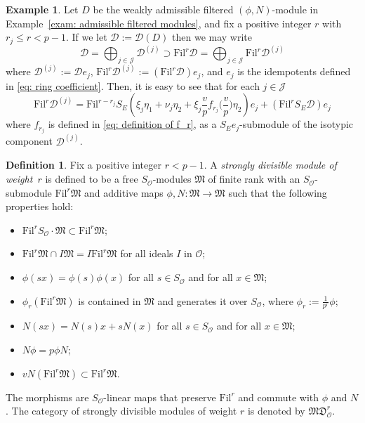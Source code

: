 \documentclass[11pt]{amsart}
\theoremstyle{definition}
\numberwithin{equation}{subsection}
\theoremstyle{plain}
\theoremstyle{plain}
\theoremstyle{plain}
\theoremstyle{plain}
\theoremstyle{plain}
\theoremstyle{plain}
\theoremstyle{plain}
\theoremstyle{plain}
\theoremstyle{plain}
\theoremstyle{plain}
\theoremstyle{plain}
\theoremstyle{plain}
\theoremstyle{definition}
\newtheorem{defi}[equation]{Definition}
\theoremstyle{definition}
\theoremstyle{definition}
\newtheorem{exam}[equation]{Example}
\theoremstyle{remark}
\renewcommand{\(}{\textup{(}}
\renewcommand{\)}{\textup{)}}
\newcommand{\fM}{\mathfrak{M}}
\newcommand{\Fil}{\mathrm{Fil}}
\newcommand{\cD}{\mathcal{D}}
\newcommand{\cO}{\mathcal{O}}
\newcommand{\cJ}{\mathcal{J}}
\begin{document}
\begin{exam}\label{exam: filtration of cD}
Let $D$ be the weakly admissible filtered $(\phi,N)$-module in Example~\ref{exam: admissible filtered modules}, and fix a positive integer $r$ with $r_j\leq r <p-1$. If we let $\cD:=\cD(D)$ then we may write $$\cD=\bigoplus_{j\in\cJ}\cD^{(j)}\supset \Fil^r\cD=\bigoplus_{j\in\cJ}\Fil^r\cD^{(j)}$$
where $\cD^{(j)}:=\cD e_j$, $\Fil^r\cD^{(j)}:=(\Fil^r\cD) e_j$, and $e_j$ is the idempotents defined in \eqref{eq: ring coefficient}. Then, it is easy to see that for each $j\in\cJ$
$$\Fil^r\cD^{(j)}=\Fil^{r-r_j}S_E \left(\xi_j\eta_1+\nu_j\eta_2+\xi_j\frac{v}{p}f_{r_j}\big(\frac{v}{p}\big)\eta_2\right)e_j+(\Fil^rS_E\cD) e_j$$
where $f_{r_j}$ is defined in \eqref{eq: definition of f_r}, as a $S_Ee_j$-submodule of the isotypic component $\cD^{(j)}$.
\end{exam}

\begin{defi}
Fix a positive integer $r< p-1$. A \emph{strongly divisible module of weight~$r$} is defined to be a free $S_{\cO}$-modules $\fM$ of finite rank with an $S_{\cO}$-submodule $\Fil^{r}\fM$ and additive maps $\phi,N:\fM\rightarrow\fM$ such that the following properties hold:
\begin{itemize}[leftmargin=*]
\item $\Fil^{r}S_{\cO}\cdot\fM\subset\Fil^{r}\fM$;
\item $\Fil^{r}\fM\cap I\fM=I\Fil^{r}\fM$ for all ideals $I$ in $\cO$;
\item $\phi(sx)=\phi(s)\phi(x)$ for all $s\in S_{\cO}$ and for all $x\in\fM$;
\item $\phi_r(\Fil^{r}\fM)$ is contained in $\fM$ and generates it over $S_{\cO}$, where $\phi_r:=\frac{1}{p^r}\phi$;
\item $N(sx)=N(s)x+sN(x)$ for all $s\in S_{\cO}$ and for all $x\in\fM$;
\item $N\phi=p\phi N$;
\item $v N(\Fil^{r}\fM)\subset\Fil^{r}\fM$.
\end{itemize}
The morphisms are $S_{\cO}$-linear maps that preserve $\Fil^r$ and commute with $\phi$ and $N$. The category of strongly divisible modules of weight $r$ is denoted by $\mathfrak{MD}^{r}_{\cO}$.
\end{defi}
\end{document}
